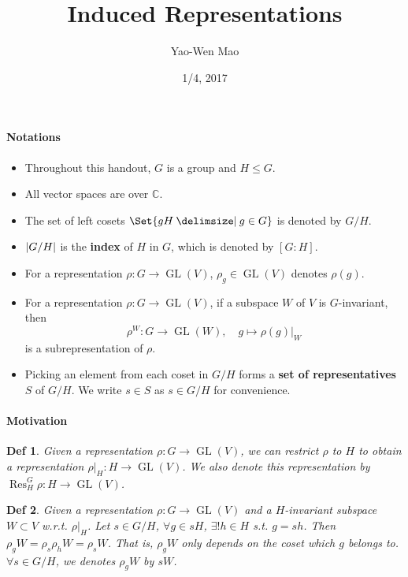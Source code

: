 \documentclass[a4paper]{article}
\title{Induced Representations}
\author{Yao-Wen Mao}
\date{1/4, 2017}
\DeclarePairedDelimiter{\abs}{\lvert}{\rvert}
\newcommand*{\Cb}{\mathbb{C}}
\DeclareMathOperator{\Res}{Res}
\newcommand*\GL[1]{\operatorname{GL}\mathopen{}\left({#1}\right)\mathclose{}}
\providecommand\given{}
\newcommand*\SetSymbol[1][]{%
  \nonscript\:#1\vert
  \allowbreak
  \nonscript\:
\mathopen{}}
\renewcommand\given{\SetSymbol[\delimsize]}
\renewcommand\given{\SetSymbol[\delimsize]}
\theoremstyle{mystyle}
\newtheorem{definition}{Def}
\begin{document}
\maketitle
\paragraph{Notations} \mbox{}
\begin{itemize}
  \item Throughout this handout, $G$ is a group and $H \le G$.
  \item All vector spaces are over $\Cb$.
  \item The set of left cosets $\Set{ gH \given g \in G }$ is denoted by $G/H$.
  \item $\abs{G/H}$ is the {\bf index} of $H$ in $G$, which is
    denoted by $[G:H]$.
  \item For a representation $\rho: G\to \GL{V}$, $\rho_g \in \GL{V}$ denotes
    $\rho(g)$.
  \item For a representation $\rho: G\to \GL{V}$, if a subspace $W$ of $V$
    is $G$-invariant, then
    \[
      \rho^W: G\to \GL{W}, \quad g \mapsto \rho(g)|_W
    \]
    is a subrepresentation of $\rho$.
  \item Picking an element from each coset in $G/H$ forms a 
    {\bf set of representatives} $S$ of $G/H$.
    We write $s\in S$ as $s\in G/H$ for convenience.
\end{itemize}

\paragraph{Motivation} \mbox{}
\begin{definition}
  Given a representation $\rho: G \to \GL{V}$, we can restrict $\rho$ to $H$
  to obtain a representation $\rho|_H: H \to \GL{V}$. We also denote this
  representation by $\Res^G_H \rho : H\to \GL{V}$.
\end{definition}

\begin{definition}
  Given a representation $\rho: G\to \GL{V}$ and a $H$-invariant
  subspace $W \subset V$ w.r.t. $\rho|_H$. Let $s\in G/H$, $\forall g \in sH$,
  $\exists! h \in H$ s.t. $g = sh$.
  Then $\rho_g W = \rho_s \rho_h W = \rho_s W$. That is, $\rho_g W$ only
  depends on the coset which $g$ belongs to. $\forall s \in G/H$,
  we denotes $\rho_g W$ by $sW$.
\end{definition}
\end{document}

